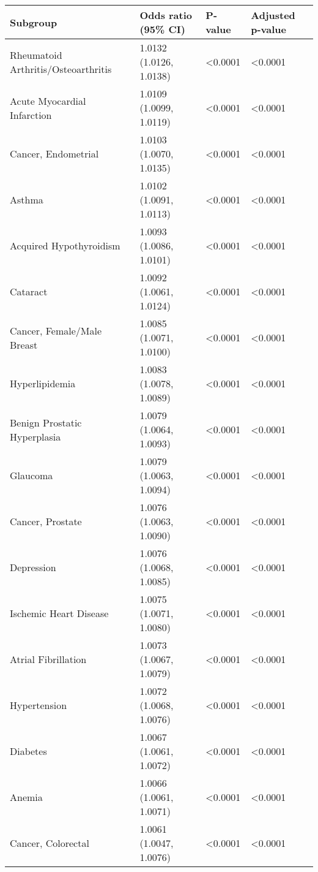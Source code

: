 \begin{table}[ht]
\centering
\begin{tabular}{llll}
  \hline
Subgroup & Odds ratio (95\% CI) & P-value & Adjusted p-value \\ 
  \hline
Rheumatoid Arthritis/Osteoarthritis & 1.0132 (1.0126, 1.0138) & \textless 0.0001 & \textless 0.0001 \\ 
  Acute Myocardial Infarction & 1.0109 (1.0099, 1.0119) & \textless 0.0001 & \textless 0.0001 \\ 
  Cancer, Endometrial & 1.0103 (1.0070, 1.0135) & \textless 0.0001 & \textless 0.0001 \\ 
  Asthma & 1.0102 (1.0091, 1.0113) & \textless 0.0001 & \textless 0.0001 \\ 
  Acquired Hypothyroidism & 1.0093 (1.0086, 1.0101) & \textless 0.0001 & \textless 0.0001 \\ 
  Cataract & 1.0092 (1.0061, 1.0124) & \textless 0.0001 & \textless 0.0001 \\ 
  Cancer, Female/Male Breast & 1.0085 (1.0071, 1.0100) & \textless 0.0001 & \textless 0.0001 \\ 
  Hyperlipidemia & 1.0083 (1.0078, 1.0089) & \textless 0.0001 & \textless 0.0001 \\ 
  Benign Prostatic Hyperplasia & 1.0079 (1.0064, 1.0093) & \textless 0.0001 & \textless 0.0001 \\ 
  Glaucoma & 1.0079 (1.0063, 1.0094) & \textless 0.0001 & \textless 0.0001 \\ 
  Cancer, Prostate & 1.0076 (1.0063, 1.0090) & \textless 0.0001 & \textless 0.0001 \\ 
  Depression & 1.0076 (1.0068, 1.0085) & \textless 0.0001 & \textless 0.0001 \\ 
  Ischemic Heart Disease & 1.0075 (1.0071, 1.0080) & \textless 0.0001 & \textless 0.0001 \\ 
  Atrial Fibrillation & 1.0073 (1.0067, 1.0079) & \textless 0.0001 & \textless 0.0001 \\ 
  Hypertension & 1.0072 (1.0068, 1.0076) & \textless 0.0001 & \textless 0.0001 \\ 
  Diabetes & 1.0067 (1.0061, 1.0072) & \textless 0.0001 & \textless 0.0001 \\ 
  Anemia & 1.0066 (1.0061, 1.0071) & \textless 0.0001 & \textless 0.0001 \\ 
  Cancer, Colorectal & 1.0061 (1.0047, 1.0076) & \textless 0.0001 & \textless 0.0001 \\ 

\end{tabular}
\end{table}
